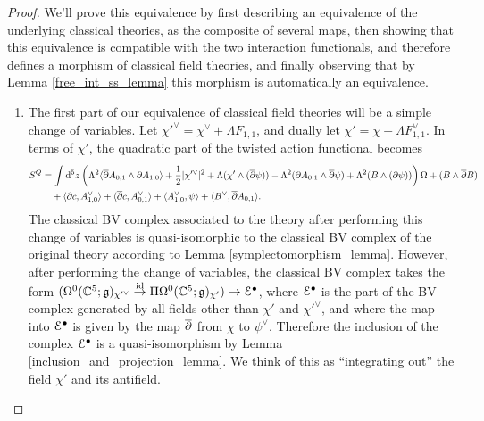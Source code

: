 \documentclass[10pt, oneside]{article}
\begin{document}
\begin{proof}
We'll prove this equivalence by first describing an equivalence of the underlying classical theories, as the composite of several maps, then showing that this equivalence is compatible with the two interaction functionals, and therefore defines a morphism of classical field theories, and finally observing that by Lemma \ref{free_int_ss_lemma} this morphism is automatically an equivalence.

\begin{enumerate}
 \item The first part of our equivalence of classical field theories will be a simple change of variables.  Let $\chi'^\vee = \chi^\vee + \Lambda F_{1,1}$, and dually let $\chi' = \chi + \Lambda F_{1,1}^\vee$.  In terms of $\chi'$, the quadratic part of the twisted action functional becomes
 \begin{align*}
  S^Q &= \int {\rm d}^5z \left(\Lambda^2 \langle \overline{\partial} A_{0,1} \wedge \partial A_{1,0} \rangle + \frac 12 |\chi'^\vee|^2 + \Lambda( \chi' \wedge (\overline{\partial} \psi)) - \Lambda^2(\partial A_{0,1} \wedge \overline{\partial} \psi) + \Lambda^2(B \wedge (\partial \psi))\right) \Omega + (B \wedge \overline{\partial} B) \\
  &\quad + \langle \partial c, A_{1,0}^\vee \rangle +  \langle \overline{\partial} c, A_{0,1}^\vee \rangle + \langle A_{1,0}^\vee, \psi \rangle + \langle B^\vee, \overline{\partial} A_{0,1} \rangle.
 \end{align*}
 The classical BV complex associated to the theory after performing this change of variables is quasi-isomorphic to the classical BV complex of the original theory according to Lemma \ref{symplectomorphism_lemma}.  However, after performing the change of variables, the classical BV complex takes the form $(\Omega^0(\mathbb C^5; \mathfrak{g})_{\chi'^\vee} \overset {\operatorname{id}} \to \Pi\Omega^0(\mathbb C^5; \mathfrak{g})_{\chi'}) \to \mathcal{E}^\bullet$, where $\mathcal{E}^\bullet$ is the part of the BV complex generated by all fields other than $\chi'$ and $\chi'^\vee$, and where the map into $\mathcal{E}^\bullet$ is given by the map $\overline{\partial}$ from $\chi$ to $\psi^\vee$.  Therefore the inclusion of the complex $\mathcal{E}^\bullet$ is a quasi-isomorphism by Lemma \ref{inclusion_and_projection_lemma}.  We think of this as ``integrating out'' the field $\chi'$ and its antifield.
 

\end{enumerate}
\end{proof}
\end{document}
